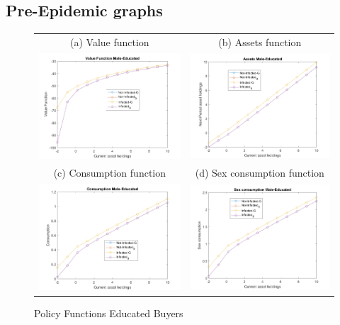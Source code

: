 \subsection{Pre-Epidemic graphs}
\begin{figure}[H]
\caption{Policy Functions Educated Buyers}
\hspace{-2.0cm}
\begin{center}
\begin{tabular}{cc}
\multicolumn{1}{c}{(a) Value function} &  
\multicolumn{1}{c}{(b) Assets function} \\
\includegraphics[angle=0,width=.5\textwidth]{figures/FIG1.png}   & 
\includegraphics[angle=0,width=.5\textwidth]{figures/FIG3.png} \\
\multicolumn{1}{c}{(c) Consumption function} &  
\multicolumn{1}{c}{(d) Sex consumption function } \\
\includegraphics[angle=0,width=.5\textwidth]{figures/FIG2.png}   & 
\includegraphics[angle=0,width=.5\textwidth]{figures/FIG4.png} \\

\end{tabular}
\end{center}
\end{figure}
